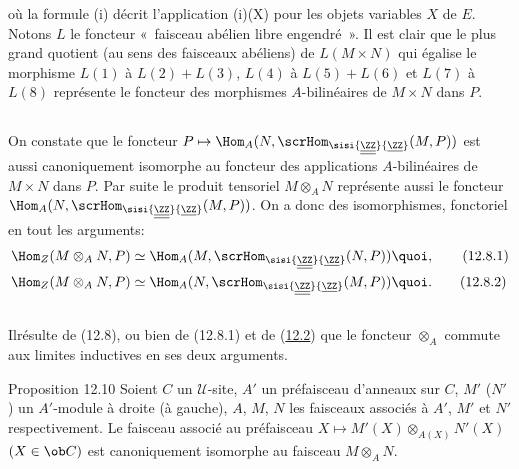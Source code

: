 où la formule (i) décrit l'application (i)(X) pour les objets
variables $X$ de $E$. Notons $L$ le foncteur « faisceau abélien
libre engendré ». Il est clair que le plus grand quotient (au sens
des faisceaux abéliens) de $L(M\times N)$ qui égalise le morphisme
$L(1)$ à $L(2)+L(3)$, $L(4)$ à $L(5)+L(6)$ et $L(7)$ à $L(8)$
représente le foncteur des morphismes $A$-bilinéaires de $M\times N$
dans $P$.

\setcounter{subsection}{7}





\subsection{}
On constate que le foncteur $P\mapsto \Hom_A(N,\scrHom_{\sisi{\underline{\underline{\ZZ}}}{\underline{\ZZ}}}(M,P))$ est
aussi canoniquement isomorphe au foncteur des applications
$A$-bilinéaires de $M\times N$ dans $P$. Par suite le produit
tensoriel $M\otimes_A N$ représente aussi le foncteur
$\Hom_A(N,\scrHom_{\sisi{\underline{\underline{\ZZ}}}{\underline{\ZZ}}}(M,P))$. On a donc des isomorphismes, fonctoriel
en tout les arguments:
\begin{align*}%
\Hom_Z(M\otimes_A N,P) &\simeq \Hom_A(M,\scrHom_{\sisi{\underline{\underline{\ZZ}}}{\underline{\ZZ}}}(N,P)){\quoi},\tag{12.8.1}\\
\Hom_Z(M\otimes_A N,P) &\simeq \Hom_A (N,\scrHom_{\sisi{\underline{\underline{\ZZ}}}{\underline{\ZZ}}}(M,P)){\quoi}.\tag{12.8.2}
\end{align*}

\subsection{}
Il\pageoriginale résulte de (12.8), ou bien de
(12.8.1) et de (\hyperref[IV.subsec12.2]{12.2}) que le foncteur
$\otimes_A$ commute aux limites inductives en ses deux arguments.

\begin{enonce*}{Proposition 12.10}
Soient $C$ un $𝒰$-site, $A'$ un préfaisceau d'anneaux sur
$C$, $M'$ (\resp $N'$) un $A'$-module à droite (\resp à gauche),
$A$, $M$, $N$ les faisceaux associés à $A'$, $M'$ et $N'$
respectivement. Le faisceau associé au préfaisceau $X\mapsto
M'(X)\otimes_{A(X)}N'(X)$ $(X\in \ob C)$ est canoniquement isomorphe
au faisceau $M\otimes_A N$.
\end{enonce*}

